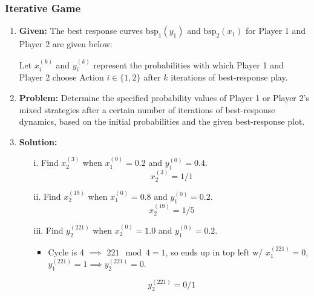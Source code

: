 \subsubsection{Iterative Game}
\begin{example}
    \begin{enumerate}

        \item \textbf{Given:} The best response curves $\text{bsp}_1(y_1)$ and $\text{bsp}_2(x_1)$ for Player 1 and Player 2 are given below:
    
    
        Let $x_i^{(k)}$ and $y_i^{(k)}$ represent the probabilities with which Player 1 and Player 2 choose Action $i \in \{1, 2\}$ after $k$ iterations of best-response play.
    
        \item \textbf{Problem:} Determine the specified probability values of Player 1 or Player 2's mixed strategies after a certain number of iterations of best-response dynamics, based on the initial probabilities and the given best-response plot.
    
        \item \textbf{Solution:}
        \begin{enumerate}
            \item[i.] Find $x_2^{(3)}$ when $x_1^{(0)} = 0.2$ and $y_1^{(0)} = 0.4$.
            \vspace{-1em}
            \[
            x_2^{(3)} = 1/1
            \]
    
            \item[ii.] Find $x_2^{(19)}$ when $x_1^{(0)} = 0.8$ and $y_1^{(0)} = 0.2$.
            \vspace{-1em}
            \[
            x_2^{(19)} = 1/5
            \]
    
            \item[iii.] Find $y_2^{(221)}$ when $x_2^{(0)} = 1.0$ and $y_1^{(0)} = 0.2$.
            \begin{itemize}
                \item Cycle is 4 $\implies$ $221 \mod 4 = 1$, so ends up in top left w/ $x_1^{(221)} = 0$, $y_1^{(221)} = 1 \implies y_2^{(221)} = 0$.
            \end{itemize}
            \[
            y_2^{(221)} = 0/1
            \]
        \end{enumerate}
    
    \end{enumerate}
\end{example}

